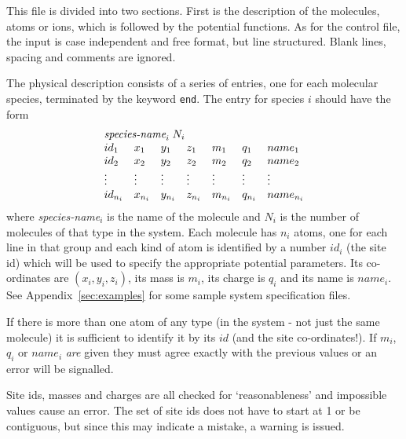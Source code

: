 \documentclass[twoside]{report}
\begin{document}
This file is divided into two sections.  First is the description of
the molecules, atoms or ions, which is followed by the potential
functions.  As for the control file, the input is case independent and
free format, but line structured. Blank lines, spacing and comments
are ignored.

The physical description consists of a series of entries, one for each
molecular species, terminated by the keyword \texttt{end}. The entry
for species $i$ should have the form
\begin{displaymath}
\begin{array}{lllllll}
\multicolumn{7}{l}{\mbox{{\it species-name}}_{i} \; N_{i}}  \\
id_{1} & x_{1} & y_{1} & z_{1}&  m_{1} & q_{1} & name_{1} \\
id_{2} & x_{2} & y_{2} & z_{2}&  m_{2} & q_{2} & name_{2} \\
\vdots & \vdots & \vdots & \vdots & \vdots & \vdots & \vdots \\
id_{n_{i}} & x_{n_{i}} & y_{n_{i}} & z_{n_{i}}& 
m_{n_{i}} & q_{n_{i}} & name_{n_{i}} \\
\end{array}
\end{displaymath}
where {\it species-name}$_{i}$ is the name of the molecule and $N_{i}$
is the number of molecules of that type in the system. Each molecule
has $n_{i}$ atoms, one for each line in that group and each kind of
atom is identified by a number $id_{i}$ (the site id) which will be
used to specify the appropriate potential parameters. Its co-ordinates
are $(x_{i},y_{i},z_{i})$, its mass is $m_{i}$, its charge is $q_{i}$
and its name is $name_{i}$.  See Appendix~\ref{sec:examples} for some
sample system specification files.

If there is more than one atom of any type (in the system - not just
the same molecule) it is sufficient to identify it by its $id$ (and
the site co-ordinates!).  If $m_{i}$, $q_{i}$ or $name_{i}$ {\em are\/}
given they must agree exactly with the previous values or an error
will be signalled.

Site ids, masses and charges are all checked for `reasonableness'
and impossible values cause an error. The set of site ids does not
have to start at 1 or be contiguous, but since this may indicate a
mistake, a warning is issued.
\end{document}
